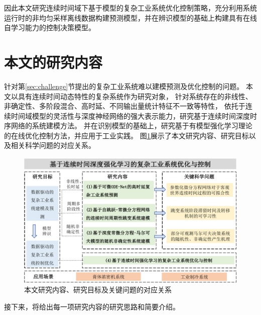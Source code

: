 因此本文研究连续时间域下基于模型的复杂工业系统优化控制策略，充分利用系统运行时的非均匀采样离线数据构建预测模型，并在辨识模型的基础上构建具有在线自学习能力的控制决策模型。

\section{本文的研究内容}
针对第\ref{sec:challenge}节提出的复杂工业系统难以建模预测及优化控制的问题。
本文以具有连续时间动态特性的复杂系统作为研究对象，
针对系统存在的非线性、非确定性、多阶段混合、高时延、不同输出量统计特征不一致等特性，
依托于连续时间域模型的灵活性与深度神经网络的强大表示能力，研究基于连续时间深度时序网络的系统建模方法。
并在识别模型的基础上，研究基于有模型强化学习理论的在线优化控制方法，并应用于工业实践。
图\ref{fig:study_goal}展示了本文研究内容、研究目标以及相关科学问题的对应关系。
\begin{figure}[h]
    \includegraphics[width=\linewidth]{figures/chapter1/study_goal.pdf}
    \caption{本文研究内容、研究目标及关键问题的对应关系}
    \label{fig:study_goal}
\end{figure}
接下来，将给出每一项研究内容的研究思路和简要介绍。

